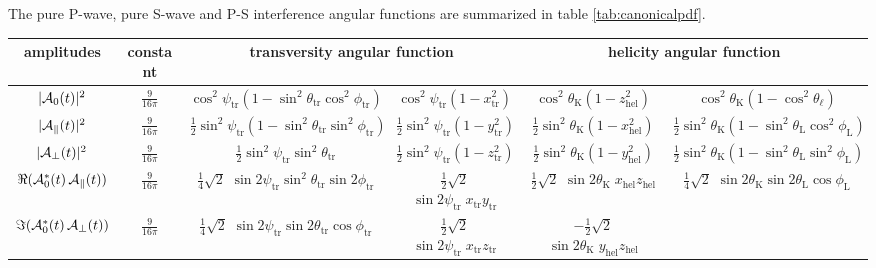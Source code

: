 \documentclass[a4paper,10pt,twosided]{article}
\def\psitr{\psi_\mathrm{tr}}
\def\thetaK{\theta_\mathrm{K}}
\def\thetaL{\theta_\mathrm{L}}
\def\phiL{\phi_\mathrm{L}}
\begin{document}
The pure P-wave, pure S-wave and P-S interference angular functions are summarized in table \ref{tab:canonicalpdf}.
\begin{sidewaystable}[htb]

  \begin{center}
    \renewcommand{\arraystretch}{1.5}
    \begin{tabular}{|c|c|c|c|c|c|}
      \hline
      amplitudes & constant & \multicolumn{2}{|c|}{transversity angular function }  &\multicolumn{2}{|c|}{ helicity angular function}\\
      \hline
      \hline
      $|{\cal{A}}_{0}(t)|^2$ & $\frac{9}{16 \pi}$
        &  $\cos^2\psitr \left(1 - \sin^2\theta_\mathrm{tr} \cos^2\phi_\mathrm{tr}\right)$  
        &  $\cos^2\psitr \left(1 - x_\mathrm{tr}^2 \right) $ 
        &  $\cos^2\thetaK \left(1 - z_\mathrm{hel}^2 \right) $ 
        &  $\cos^2\thetaK \left(1 - \cos^2\theta_\ell \right) $ \\
      $|{\cal{A}}_{\parallel}(t)|^2$ & $\frac{9}{16 \pi}$
        &  $\frac{1}{2}\sin^2\psitr \left(1 - \sin^2\theta_\mathrm{tr} \sin^2\phi_\mathrm{tr}\right)$  
        &  $\frac{1}{2}\sin^2\psitr \left(1 - y_\mathrm{tr}^2 \right)$
        &  $\frac{1}{2}\sin^2\thetaK \left(1 - x_\mathrm{hel}^2 \right)$
        &  $\frac{1}{2}\sin^2\thetaK \left(1 - \sin^2\thetaL\cos^2\phiL \right)$\\
      $|{\cal{A}}_{\perp}(t)|^2$ & $\frac{9}{16 \pi}$
        &  $\frac{1}{2}\sin^2\psitr \sin^2\theta_\mathrm{tr}$  
        &  $\frac{1}{2}\sin^2\psitr \left(1- z_\mathrm{tr}^2\right)$  
        &  $\frac{1}{2}\sin^2\thetaK\left(1- y_\mathrm{hel}^2\right)$  
        &  $\frac{1}{2}\sin^2\thetaK\left(1-\sin^2\thetaL\sin^2\phiL\right)$  \\
      $\Re({\cal{A}}_{0}^{*}(t)\,{\cal{A}}_{\parallel}(t))$ & $\frac{9}{16 \pi}$
        &   $\frac{1}{4}\sqrt{2}$ $\sin2\psitr \sin^2\theta_\mathrm{tr} \sin2\phi_\mathrm{tr}$  
        &   $\frac{1}{2}\sqrt{2}$ $\sin2\psitr\; x_\mathrm{tr}y_\mathrm{tr}$ 
        &   $\frac{1}{2}\sqrt{2}$ $\sin2\thetaK\; x_\mathrm{hel}z_\mathrm{hel}$ 
        &   $\frac{1}{4}\sqrt{2}$ $\sin2\thetaK\sin2\thetaL\cos\phiL$ \\
      $\Im({\cal{A}}_{0}^{*}(t)\,{\cal{A}}_{\perp}(t))$ & $\frac{9}{16 \pi}$
        &  $\frac{1}{4}\sqrt{2}$ $\sin2\psitr \sin2\theta_\mathrm{tr} \cos\phi_\mathrm{tr}$  
        &  $\frac{1}{2}\sqrt{2}$ $\sin2\psitr\; x_\mathrm{tr}z_\mathrm{tr}$  
        &  $-\frac{1}{2}\sqrt{2}$ $\sin2\thetaK\; y_\mathrm{hel}z_\mathrm{hel}$  

\end{tabular}
\end{center}
\end{sidewaystable}
\end{document}
